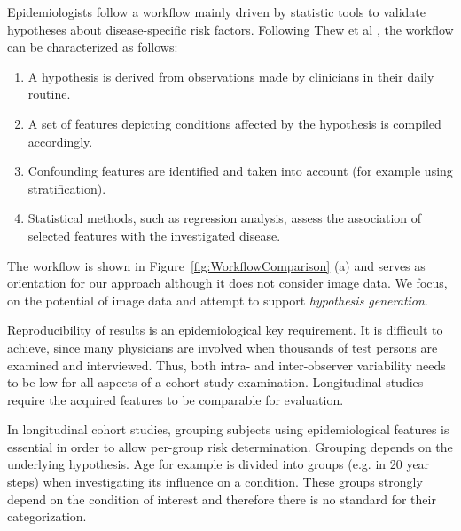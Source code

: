 \documentclass[journal]{style/vgtc} 			          %
\begin{document}
%
Epidemiologists follow a workflow mainly driven by statistic tools to validate hypotheses about disease-specific risk factors.
%
Following Thew et al \cite{Thew2009}, the workflow can be characterized as follows:
%
\begin{enumerate}
	\item A hypothesis is derived from observations made by clinicians in their daily routine.
%
	\item A set of features depicting conditions affected by the hypothesis is compiled accordingly.
%
	\item Confounding features are identified and taken into account (for example using stratification).
%
	\item Statistical methods, such as regression analysis, assess the association of selected features with the investigated disease.
%
\end{enumerate}
The workflow is shown in Figure~\ref{fig:WorkflowComparison} (a) and serves as orientation for our approach although it does not consider image data.
%
We focus, on the potential of image data and attempt to support \emph{hypothesis generation}.

Reproducibility of results is an epidemiological key requirement.
%
It is difficult to achieve, since many physicians are involved when thousands of test persons are examined and interviewed.
%
Thus, both intra- and inter-observer variability needs to be low for all aspects of a cohort study examination.
%
Longitudinal studies require the acquired features to be comparable for evaluation.
%
%

In longitudinal cohort studies, grouping subjects using epidemiological features is essential in order to allow per-group risk determination.
%
Grouping depends on the underlying hypothesis.
%
Age for example is divided into groups (e.g. in 20 year steps) when investigating its influence on a condition.
%
These groups strongly depend on the condition of interest and therefore there is no standard for their categorization.
\end{document}
